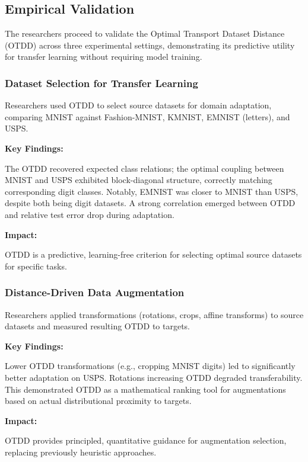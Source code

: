 \documentclass[11pt, a4paper]{article}
\theoremstyle{plain} %
\theoremstyle{definition} %
\begin{document}
		\subsection{Empirical Validation}
		\label{sec:empirical_validation}
			The researchers proceed to validate the Optimal Transport Dataset Distance (OTDD) across three experimental settings, demonstrating its predictive utility for transfer learning without requiring model training.
			\subsubsection{Dataset Selection for Transfer Learning}
			\label{sec:dataset_for_transfer_learning}
				Researchers used OTDD to select source datasets for domain adaptation, comparing MNIST against Fashion-MNIST, KMNIST, EMNIST (letters), and USPS.

				\textbf{Key Findings:}

				The OTDD recovered expected class relations; the optimal coupling between MNIST and USPS exhibited block-diagonal structure, correctly matching corresponding digit classes. Notably, EMNIST was closer to MNIST than USPS, despite both being digit datasets. A strong correlation emerged between OTDD and relative test error drop during adaptation.

				\textbf{Impact:}

				OTDD is a predictive, learning-free criterion for selecting optimal source datasets for specific tasks.

			\subsubsection{Distance-Driven Data Augmentation}
			\label{sec:distance_drive_augmentation}
				Researchers applied transformations (rotations, crops, affine transforms) to source datasets and measured resulting OTDD to targets.

				\textbf{Key Findings:}

				Lower OTDD transformations (e.g., cropping MNIST digits) led to significantly better adaptation on USPS. Rotations increasing OTDD degraded transferability. This demonstrated OTDD as a mathematical ranking tool for augmentations based on actual distributional proximity to targets.

				\textbf{Impact:}

				OTDD provides principled, quantitative guidance for augmentation selection, replacing previously heuristic approaches.
\end{document}
